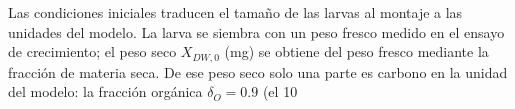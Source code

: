 Las condiciones iniciales traducen el tamaño de las larvas al montaje a las unidades del modelo. La larva se siembra con un peso fresco medido en el ensayo de crecimiento; el peso seco $X_{DW,0}$ (mg) se obtiene del peso fresco mediante la fracción de materia seca. De ese peso seco solo una parte es carbono en la unidad del modelo: la fracción orgánica $\delta_O = 0.9$ (el 10%

